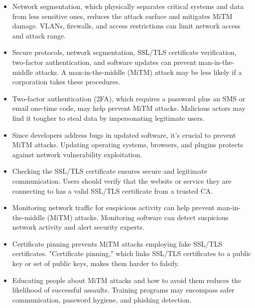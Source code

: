\documentclass[letterpaper,10pt,conference]{IEEEtran}
\begin{document}
\begin{itemize}

\item Network segmentation, which physically separates critical systems and data from less sensitive ones, reduces the attack surface and mitigates MiTM damage. VLANs, firewalls, and access restrictions can limit network access and attack range.

 \item Secure protocols, network segmentation, SSL/TLS certificate verification, two-factor authentication, and software updates can prevent man-in-the-middle attacks. A man-in-the-middle (MiTM) attack may be less likely if a corporation takes these procedures.
 
 \item Two-factor authentication (2FA), which requires a password plus an SMS or email one-time code, may help prevent MiTM attacks. Malicious actors may find it tougher to steal data by impersonating legitimate users. 

 \item Since developers address bugs in updated software, it's crucial to prevent MiTM attacks. Updating operating systems, browsers, and plugins protects against network vulnerability exploitation.
 
\item Checking the SSL/TLS certificate ensures secure and legitimate communication. Users should verify that the website or service they are connecting to has a valid SSL/TLS certificate from a trusted CA.
    
\item Monitoring network traffic for suspicious activity can help prevent man-in-the-middle (MiTM) attacks. Monitoring software can detect suspicious network activity and alert security experts.
 
\item Certificate pinning prevents MiTM attacks employing fake SSL/TLS certificates. "Certificate pinning," which links SSL/TLS certificates to a public key or set of public keys, makes them harder to falsify.
 

\item Educating people about MiTM attacks and how to avoid them reduces the likelihood of successful assaults. Training programs may encompass safer communication, password hygiene, and phishing detection.


\end{itemize}
\end{document}
